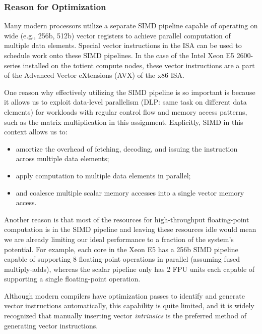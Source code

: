 
\subsubsection{Reason for Optimization}
Many modern processors utilize a separate SIMD pipeline capable of
operating on wide (e.g., 256b, 512b) vector registers to achieve parallel
computation of multiple data elements. Special vector instructions in the
ISA can be used to schedule work onto these SIMD pipelines. In the case
of the Intel Xeon E5 2600-series installed on the totient compute nodes,
these vector instructions are a part of the Advanced Vector eXtensions
(AVX) of the x86 ISA.
\smallskip

One reason why effectively utilizing the SIMD pipeline is so important is
because it allows us to exploit data-level parallelism (DLP: same task on
different data elements) for workloads with regular control flow and
memory access patterns, such as the matrix multiplication in this
assignment. Explicitly, SIMD in this context allows us to:

\begin{itemize}
  \item amortize the overhead of fetching, decoding, and issuing the
    instruction across multiple data elements;
  \item apply computation to multiple data elements in parallel;
  \item and coalesce multiple scalar memory accesses into a single vector
    memory access.
\end{itemize}
\smallskip

Another reason is that most of the resources for high-throughput
floating-point computation is in the SIMD pipeline and leaving these
resources idle would mean we are already limiting our ideal performance
to a fraction of the system's potential. For example, each core in the
Xeon E5 has a 256b SIMD pipeline capable of supporting 8 floating-point
operations in parallel (assuming fused multiply-adds), whereas the scalar
pipeline only has 2 FPU units each capable of supporting a single
floating-point operation.
\smallskip

Although modern compilers have optimization passes to identify and
generate vector instructions automatically, this capability is quite
limited, and it is widely recognized that manually inserting vector
\emph{intrinsics} is the preferred method of generating vector
instructions.
\medskip

